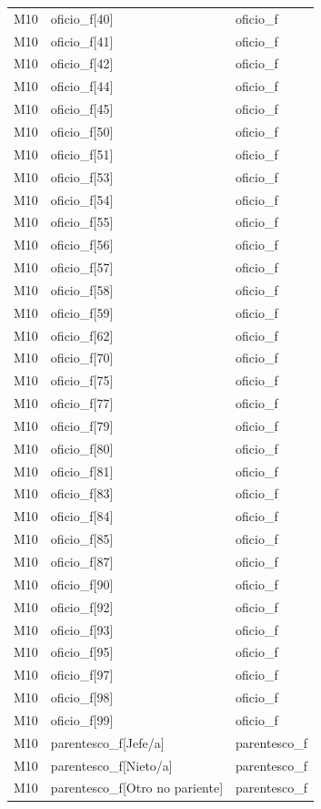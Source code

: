 \begin{longtable}{lll}
M10 & oficio\_f[40] & oficio\_f \\
M10 & oficio\_f[41] & oficio\_f \\
M10 & oficio\_f[42] & oficio\_f \\
M10 & oficio\_f[44] & oficio\_f \\
M10 & oficio\_f[45] & oficio\_f \\
M10 & oficio\_f[50] & oficio\_f \\
M10 & oficio\_f[51] & oficio\_f \\
M10 & oficio\_f[53] & oficio\_f \\
M10 & oficio\_f[54] & oficio\_f \\
M10 & oficio\_f[55] & oficio\_f \\
M10 & oficio\_f[56] & oficio\_f \\
M10 & oficio\_f[57] & oficio\_f \\
M10 & oficio\_f[58] & oficio\_f \\
M10 & oficio\_f[59] & oficio\_f \\
M10 & oficio\_f[62] & oficio\_f \\
M10 & oficio\_f[70] & oficio\_f \\
M10 & oficio\_f[75] & oficio\_f \\
M10 & oficio\_f[77] & oficio\_f \\
M10 & oficio\_f[79] & oficio\_f \\
M10 & oficio\_f[80] & oficio\_f \\
M10 & oficio\_f[81] & oficio\_f \\
M10 & oficio\_f[83] & oficio\_f \\
M10 & oficio\_f[84] & oficio\_f \\
M10 & oficio\_f[85] & oficio\_f \\
M10 & oficio\_f[87] & oficio\_f \\
M10 & oficio\_f[90] & oficio\_f \\
M10 & oficio\_f[92] & oficio\_f \\
M10 & oficio\_f[93] & oficio\_f \\
M10 & oficio\_f[95] & oficio\_f \\
M10 & oficio\_f[97] & oficio\_f \\
M10 & oficio\_f[98] & oficio\_f \\
M10 & oficio\_f[99] & oficio\_f \\
M10 & parentesco\_f[Jefe/a] & parentesco\_f \\
M10 & parentesco\_f[Nieto/a] & parentesco\_f \\
M10 & parentesco\_f[Otro no pariente] & parentesco\_f \\

\end{longtable}
